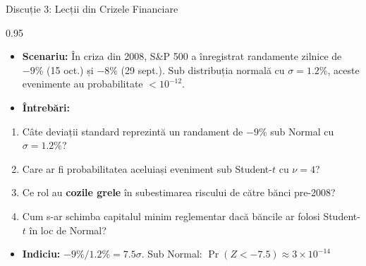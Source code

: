\documentclass[9pt, aspectratio=169, t]{beamer}
\begin{document}
\begin{frame}{Discuție 3: Lecții din Crizele Financiare}
\begin{cminipage}{0.95\textwidth}
    \begin{itemize}\setlength{\itemsep}{0pt}
        \item \textbf{Scenariu:} În criza din 2008, S\&P 500 a înregistrat randamente zilnice de $-9\%$ (15 oct.) și $-8\%$ (29 sept.). Sub distribuția normală cu $\sigma = 1.2\%$, aceste evenimente au probabilitate $< 10^{-12}$.
        \item \textbf{Întrebări:}
    \end{itemize}
    \begin{enumerate}\setlength{\itemsep}{0pt}
        \item Câte deviații standard reprezintă un randament de $-9\%$ sub Normal cu $\sigma = 1.2\%$?
        \item Care ar fi probabilitatea aceluiași eveniment sub Student-$t$ cu $\nu = 4$?
        \item Ce rol au \textbf{cozile grele} în subestimarea riscului de către bănci pre-2008?
        \item Cum s-ar schimba capitalul minim reglementar dacă băncile ar folosi Student-$t$ în loc de Normal?
    \end{enumerate}

    \vspace{0.2cm}
    \begin{itemize}\setlength{\itemsep}{0pt}
        \item \textbf{Indiciu:} $-9\% / 1.2\% = 7.5\sigma$. Sub Normal: $\Pr(Z < -7.5) \approx 3 \times 10^{-14}$
    \end{itemize}
\end{cminipage}
\end{frame}
\end{document}
